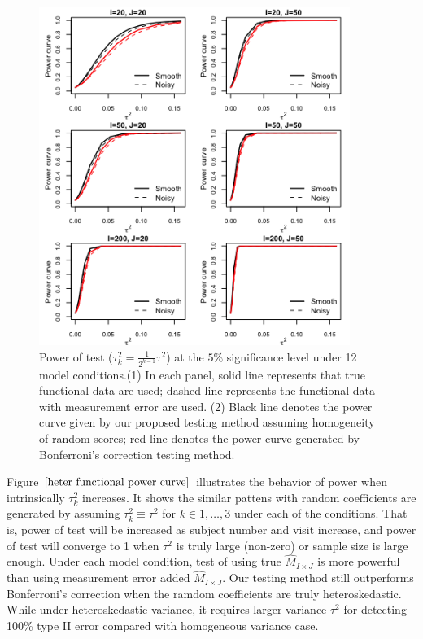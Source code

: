 \begin{figure}[h!]
\centering
\includegraphics[width=0.9\textwidth]{bonf_heter_power.png}
\caption{Power of test ($\tau_k^2=\frac{1}{2^{k-1}}\tau^2$) at the $5\%$ significance level under 12 model conditions.(1) In each panel, solid line represents that true functional data are used; dashed line represents the functional data with measurement error are used. (2) Black line denotes the power curve given by our proposed testing method assuming homogeneity of random scores; red line denotes the power curve generated by Bonferroni's correction testing method.}
\label{heter functional power curve}
\end{figure}

Figure $\ref{heter functional power curve}$ illustrates the behavior of power when intrinsically $\tau_k^2$ increases. It shows the similar pattens with random coefficients are generated by assuming $\tau_k^2\equiv\tau^2$ for $k \in {1,\dots,3}$ under each of the conditions. That is, power of test will be increased as subject number and visit increase, and power of test will converge to 1 when $\tau^2$ is truly large (non-zero) or sample size is large enough. Under each model condition, test of using true $\hat{M}_{I\times J}$ is more powerful than using measurement error added $\hat{M}_{I\times J}$. Our testing method still outperforms Bonferroni's correction when the ramdom coefficients are truly heteroskedastic. While under heteroskedastic variance, it requires larger variance $\tau^2$ for detecting 100\% type II error compared with homogeneous variance case. 
\newpage

